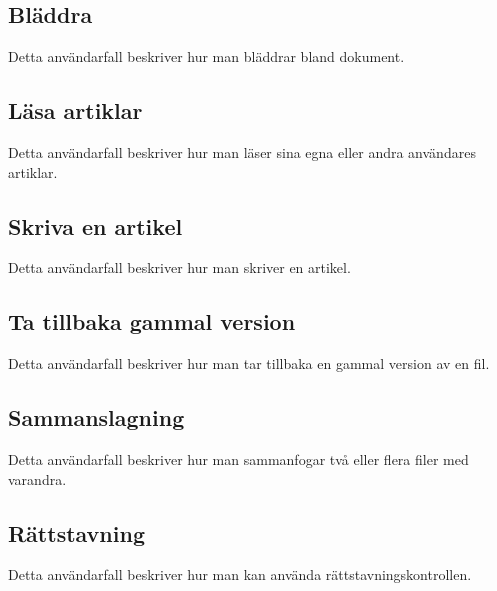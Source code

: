 \subsection{Bläddra}
Detta användarfall beskriver hur man bläddrar bland dokument.
\subsection{Läsa artiklar}
Detta användarfall beskriver hur man läser sina egna eller andra användares artiklar.
\subsection{Skriva en artikel}
Detta användarfall beskriver hur man skriver en artikel.
\subsection{Ta tillbaka gammal version}
Detta användarfall beskriver hur man tar tillbaka en gammal version av en fil.
\subsection{Sammanslagning}
Detta användarfall beskriver hur man sammanfogar två eller flera filer med varandra.
\subsection{Rättstavning}
Detta användarfall beskriver hur man kan använda rättstavningskontrollen.

